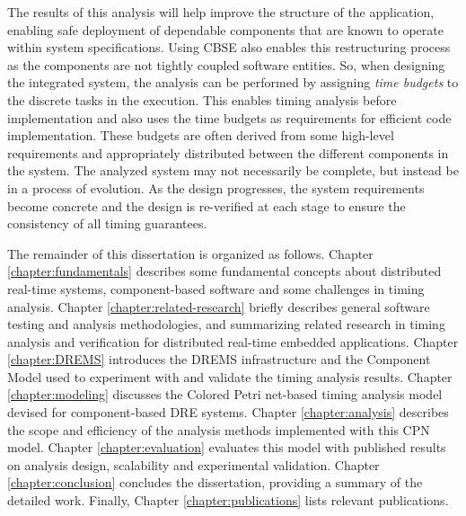 The results of this analysis will help improve the structure of the application, enabling safe deployment of dependable components that are known to operate within system specifications. Using CBSE also enables this restructuring process as the components are not tightly coupled software entities. So, when designing the integrated system, the analysis can be performed by assigning \emph{time budgets} to the discrete tasks in the execution. This enables timing analysis before implementation and also uses the time budgets as requirements for efficient code implementation. These budgets are often derived from some high-level requirements and appropriately distributed between the different components in the system. The analyzed system may not necessarily be complete, but instead be in a process of evolution. As the design progresses, the system requirements become concrete and the design is re-verified at each stage to ensure the consistency of all timing guarantees. 

The remainder of this dissertation is organized as follows. Chapter \ref{chapter:fundamentals} describes some fundamental concepts about distributed real-time systems, component-based software and some challenges in timing analysis. Chapter \ref{chapter:related-research} briefly describes general software testing and analysis methodologies, and summarizing related research in timing analysis and verification for distributed real-time embedded applications. Chapter \ref{chapter:DREMS} introduces the DREMS infrastructure and the Component Model used to experiment with and validate the timing analysis results. Chapter \ref{chapter:modeling} discusses the Colored Petri net-based timing analysis model devised for component-based DRE systems. Chapter \ref{chapter:analysis} describes the scope and efficiency of the analysis methods implemented with this CPN model. Chapter \ref{chapter:evaluation} evaluates this model with published results on analysis design, scalability and experimental validation. Chapter \ref{chapter:conclusion} concludes the dissertation, providing a summary of the detailed work. Finally, Chapter \ref{chapter:publications} lists relevant publications.